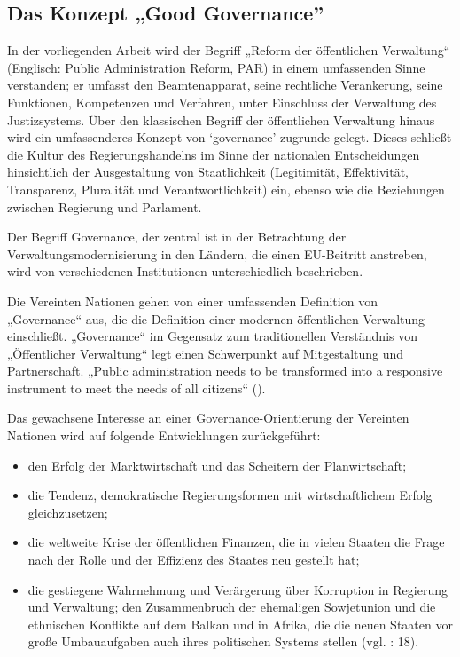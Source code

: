 \subsection{Das Konzept „Good Governance”}
In der vorliegenden Arbeit wird der Begriff „Reform der öffentlichen Verwaltung“ (Englisch: Public Administration Reform, PAR) in einem umfassenden Sinne verstanden; er umfasst den Beamtenapparat, seine rechtliche Verankerung, seine Funktionen, Kompetenzen und Verfahren, unter Einschluss der Verwaltung des Justizsystems. Über den klassischen Begriff der öffentlichen Verwaltung hinaus wird ein umfassenderes Konzept von ‘governance’ zugrunde gelegt. Dieses schließt die Kultur des Regierungshandelns im Sinne der nationalen Entscheidungen hinsichtlich der Ausgestaltung von Staatlichkeit (Legitimität, Effektivität, Transparenz, Pluralität und Verantwortlichkeit) ein, ebenso wie die Beziehungen zwischen Regierung und Parlament.\par
Der Begriff Governance, der zentral ist in der Betrachtung der Verwaltungsmodernisierung in den Ländern, die einen EU-Beitritt anstreben, wird von verschiedenen Institutionen unterschiedlich beschrieben.\par
Die Vereinten Nationen gehen von einer umfassenden Definition von „Governance“ aus, die die Definition einer modernen öffentlichen Verwaltung einschließt. „Governance“ im Gegensatz zum traditionellen Verständnis von „Öffentlicher Verwaltung“ legt einen Schwerpunkt auf Mitgestaltung und Partnerschaft. „Public administration needs to be transformed into a responsive instrument to meet the needs of all citizens“ (\cite{unpan}).\par
Das gewachsene Interesse an einer Governance-Orientierung der Vereinten Nationen wird auf folgende Entwicklungen zurückgeführt:
\begin{itemize}
\item den Erfolg der Marktwirtschaft und das Scheitern der Planwirtschaft;
\item die Tendenz, demokratische Regierungsformen mit wirtschaftlichem Erfolg gleichzusetzen;
\item die weltweite Krise der öffentlichen Finanzen, die in vielen Staaten die Frage nach der Rolle und der Effizienz des Staates neu gestellt hat; 
\item die gestiegene Wahrnehmung und Verärgerung über Korruption in Regierung und Verwaltung;
den Zusammenbruch der ehemaligen Sowjetunion und die ethnischen Konflikte auf dem Balkan und in Afrika, die die neuen Staaten vor große Umbauaufgaben auch ihres politischen Systems stellen (vgl. \cite{undp} : 18).
\end{itemize}
